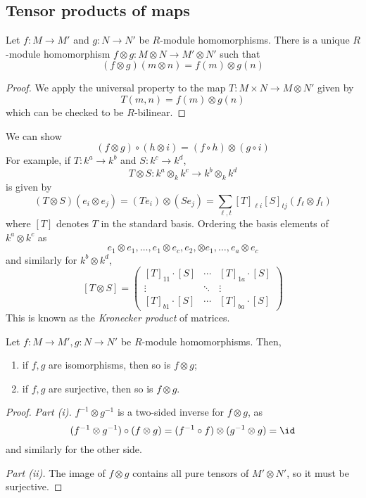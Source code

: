 \subsection{Tensor products of maps}
\begin{proposition}
    Let \( f : M \to M' \) and \( g : N \to N' \) be \( R \)-module homomorphisms.
    There is a unique \( R \)-module homomorphism \( f \otimes g : M \otimes N \to M' \otimes N' \) such that
    \[ (f \otimes g)(m \otimes n) = f(m) \otimes g(n) \]
\end{proposition}
\begin{proof}
    We apply the universal property to the map \( T : M \times N \to M \otimes N' \) given by
    \[ T(m, n) = f(m) \otimes g(n) \]
    which can be checked to be \( R \)-bilinear.
\end{proof}
\begin{example}
    We can show
    \[ (f \otimes g) \circ (h \otimes i) = (f \circ h) \otimes (g \circ i) \]
    For example, if \( T : k^a \to k^b \) and \( S : k^c \to k^d \),
    \[ T \otimes S : k^a \otimes_k k^c \to k^b \otimes_k k^d \]
    is given by
    \[ (T \otimes S)(e_i \otimes e_j) = (T e_i) \otimes (S e_j) = \sum_{\ell, t} [T]_{\ell i} [S]_{t j} (f_\ell \otimes f_t) \]
    where \( [T] \) denotes \( T \) in the standard basis.
    Ordering the basis elements of \( k^a \otimes k^c \) as
    \[ e_1 \otimes e_1, \dots, e_1 \otimes e_c, e_2, \otimes e_1, \dots, e_a \otimes e_c \]
    and similarly for \( k^b \otimes k^d \),
    \[ [T \otimes S] = \begin{pmatrix}
        [T]_{11} \cdot [S] & \cdots & [T]_{1a} \cdot [S] \\
        \vdots & \ddots & \vdots \\
        [T]_{b1} \cdot [S] & \cdots & [T]_{ba} \cdot [S]
    \end{pmatrix} \]
    This is known as the \emph{Kronecker product} of matrices.
\end{example}
\begin{proposition}
    Let \( f : M \to M', g : N \to N' \) be \( R \)-module homomorphisms.
    Then,
    \begin{enumerate}
        \item if \( f, g \) are isomorphisms, then so is \( f \otimes g \);
        \item if \( f, g \) are surjective, then so is \( f \otimes g \).
    \end{enumerate}
\end{proposition}
\begin{proof}
    \emph{Part (i).}
    \( f^{-1} \otimes g^{-1} \) is a two-sided inverse for \( f \otimes g \), as
    \[ (f^{-1} \otimes g^{-1}) \circ (f \otimes g) = (f^{-1} \circ f) \otimes (g^{-1} \otimes g) = \id \]
    and similarly for the other side.

    \emph{Part (ii).}
    The image of \( f \otimes g \) contains all pure tensors of \( M' \otimes N' \), so it must be surjective.
\end{proof}
